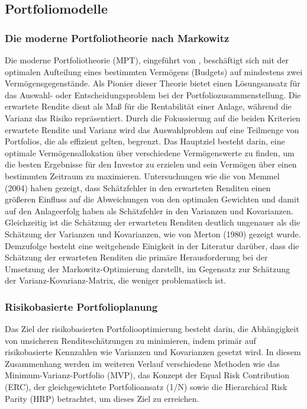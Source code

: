 \documentclass[a4paper, 12pt]{article}
\begin{document}
\subsection{Portfoliomodelle}\label{subsec:portfolios}
\subsubsection{Die moderne Portfoliotheorie nach Markowitz}
Die moderne Portfoliotheorie (MPT), eingeführt von \textcite{markowitz1952}, beschäftigt sich mit der optimalen Aufteilung eines bestimmten Vermögens (Budgets) auf mindestens zwei Vermögensgegenstände.
Als Pionier dieser Theorie bietet \citeauthor{markowitz1952} einen Lösungsansatz für das Auswahl- oder Entscheidungsproblem bei der Portfoliozusammenstellung.
Die erwartete Rendite dient als Maß für die Rentabilität einer Anlage, während die Varianz das Risiko repräsentiert.
Durch die Fokussierung auf die beiden Kriterien erwartete Rendite und Varianz wird das Auswahlproblem auf eine Teilmenge von Portfolios, die als effizient gelten, begrenzt.
Das Hauptziel besteht darin, eine optimale Vermögensallokation über verschiedene Vermögenswerte zu finden, um die besten Ergebnisse für den Investor zu erzielen und sein Vermögen über einen bestimmten Zeitraum zu maximieren.
Untersuchungen wie die von Memmel (2004) haben gezeigt, dass Schätzfehler in den erwarteten Renditen einen größeren Einfluss auf die Abweichungen von den optimalen Gewichten und damit auf den Anlageerfolg haben als Schätzfehler in den Varianzen und Kovarianzen.
Gleichzeitig ist die Schätzung der erwarteten Renditen deutlich ungenauer als die Schätzung der Varianzen und Kovarianzen, wie von Merton (1980) gezeigt wurde.
Demzufolge besteht eine weitgehende Einigkeit in der Literatur darüber, dass die Schätzung der erwarteten Renditen die primäre Herausforderung bei der Umsetzung der Markowitz-Optimierung darstellt, im Gegensatz zur Schätzung der Varianz-Kovarianz-Matrix, die weniger problematisch ist.

\subsubsection{Risikobasierte Portfolioplanung}
Das Ziel der risikobasierten Portfoliooptimierung besteht darin, die Abhängigkeit von unsicheren Renditeschätzungen zu minimieren, indem primär auf risikobasierte Kennzahlen wie Varianzen und Kovarianzen gesetzt wird.
In diesem Zusammenhang werden im weiteren Verlauf verschiedene Methoden wie das Minimum-Varianz-Portfolio (MVP), das Konzept der Equal Risk Contribution (ERC), der gleichgewichtete Portfolioansatz (1/N) sowie die Hierarchical Risk Parity (HRP) betrachtet, um dieses Ziel zu erreichen.
\end{document}
